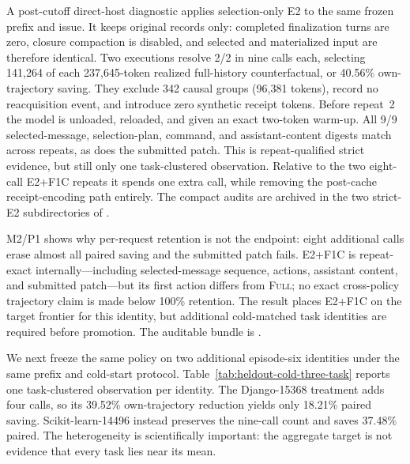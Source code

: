 \documentclass[11pt]{article}
\begin{document}
A post-cutoff direct-host diagnostic applies selection-only E2 to the same
frozen prefix and issue.  It keeps original records only: completed
finalization turns are zero, closure compaction is disabled, and selected and
materialized input are therefore identical.  Two executions resolve 2/2 in
nine calls each, selecting 141,264 of each 237,645-token realized full-history
counterfactual, or 40.56\% own-trajectory saving.  They exclude 342 causal
groups (96,381 tokens), record no reacquisition event, and introduce zero
synthetic receipt tokens.  Before repeat~2 the model is unloaded, reloaded, and
given an exact two-token warm-up.  All 9/9 selected-message, selection-plan,
command, and assistant-content digests match across repeats, as does the
submitted patch.  This is repeat-qualified strict evidence, but still only one
task-clustered observation.  Relative to the two eight-call E2+F1C repeats it
spends one extra call, while removing the post-cache receipt-encoding path
entirely.  The compact audits are archived in the two strict-E2 subdirectories
of
.

M2/P1 shows why per-request retention is not the endpoint: eight additional
calls erase almost all paired saving and the submitted patch fails.  E2+F1C is
repeat-exact internally---including selected-message sequence, actions,
assistant content, and submitted patch---but its first action differs from
\textsc{Full}; no exact cross-policy trajectory claim is made below 100\%
retention.  The result places E2+F1C on the target frontier for this identity,
but additional cold-matched task identities are required before promotion.  The
auditable bundle is
.

We next freeze the same policy on two additional episode-six identities under
the same prefix and cold-start protocol.  Table~\ref{tab:heldout-cold-three-task}
reports one task-clustered observation per identity.  The Django-15368
treatment adds four calls, so its 39.52\% own-trajectory reduction yields only
18.21\% paired saving.  Scikit-learn-14496 instead preserves the nine-call
count and saves 37.48\% paired.  The heterogeneity is scientifically important:
the aggregate target is not evidence that every task lies near its mean.
\end{document}
